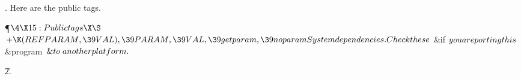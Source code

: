 . Here are the public tags.

\Y\P$\4\X15:Public tags\X\S$\6
$+\K(\\{REF}\\{PARAM},\39\\{VAL}),\39\\{PARAM},\39\\{VAL},\39\\{get}\\{param},%
\39\\{no}\\{param}\\{System}\\{dependencies}.\\{Check}\\{these}$  \6
\&{if} $\\{you}\\{are}\\{porting}\\{this}$ \6
\4\&{program}\1\  $\mathrel{\&{to}}\\{another}\\{platform}.$\par

\U2.\fi


